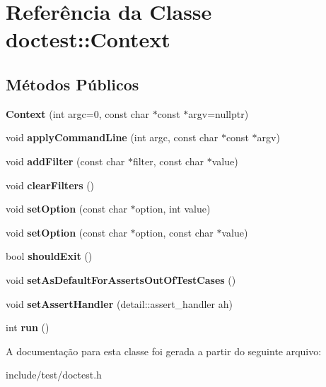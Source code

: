 \hypertarget{classdoctest_1_1Context}{}\section{Referência da Classe doctest\+:\+:Context}
\label{classdoctest_1_1Context}
\subsection*{Métodos Públicos}
\begin{DoxyCompactItemize}
\item 
\mbox{\label{classdoctest_1_1Context_a881bc2d0fe207d672e1debe830768a98}} 
{\bfseries Context} (int argc=0, const char $\ast$const $\ast$argv=nullptr)
\item 
\mbox{\label{classdoctest_1_1Context_ad55229220bf9ca74e6e0c6323bf672e1}} 
void {\bfseries apply\+Command\+Line} (int argc, const char $\ast$const $\ast$argv)
\item 
\mbox{\label{classdoctest_1_1Context_a60ad57a46c19db2b142468c3acac448a}} 
void {\bfseries add\+Filter} (const char $\ast$filter, const char $\ast$value)
\item 
\mbox{\label{classdoctest_1_1Context_aaa878723e89310d5aa3f516bc7ab3165}} 
void {\bfseries clear\+Filters} ()
\item 
\mbox{\label{classdoctest_1_1Context_a95e7a0230c5897f0eae36718f51d2f05}} 
void {\bfseries set\+Option} (const char $\ast$option, int value)
\item 
\mbox{\label{classdoctest_1_1Context_a4352ffc196c4ba56045270e45baa2754}} 
void {\bfseries set\+Option} (const char $\ast$option, const char $\ast$value)
\item 
\mbox{\label{classdoctest_1_1Context_a219b10301380b81c84c0824a6876d9aa}} 
bool {\bfseries should\+Exit} ()
\item 
\mbox{\label{classdoctest_1_1Context_ae85cecc7689f009e23cba383484773b2}} 
void {\bfseries set\+As\+Default\+For\+Asserts\+Out\+Of\+Test\+Cases} ()
\item 
\mbox{\label{classdoctest_1_1Context_a669dd0a596a611eeb0decdb78b661a90}} 
void {\bfseries set\+Assert\+Handler} (detail\+::assert\+\_\+handler ah)
\item 
\mbox{\label{classdoctest_1_1Context_a8059b137ef41cbe6c5d8160806a3cc63}} 
int {\bfseries run} ()
\end{DoxyCompactItemize}


A documentação para esta classe foi gerada a partir do seguinte arquivo\+:\begin{DoxyCompactItemize}
\item 
include/test/doctest.\+h\end{DoxyCompactItemize}
